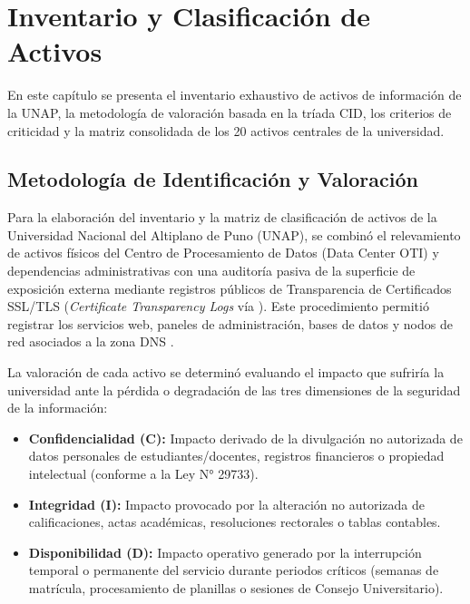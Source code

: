 \chapter{Inventario y Clasificación de Activos}
\label{ch:inventario_activos}

En este capítulo se presenta el inventario exhaustivo de activos de información de la UNAP, la metodología de valoración basada en la tríada CID, los criterios de criticidad y la matriz consolidada de los 20 activos centrales de la universidad.

\section{Metodología de Identificación y Valoración}

Para la elaboración del inventario y la matriz de clasificación de activos de la Universidad Nacional del Altiplano de Puno (UNAP), se combinó el relevamiento de activos físicos del Centro de Procesamiento de Datos (Data Center OTI) y dependencias administrativas con una auditoría pasiva de la superficie de exposición externa mediante registros públicos de Transparencia de Certificados SSL/TLS (\textit{Certificate Transparency Logs} vía ). Este procedimiento permitió registrar los servicios web, paneles de administración, bases de datos y nodos de red asociados a la zona DNS .

La valoración de cada activo se determinó evaluando el impacto que sufriría la universidad ante la pérdida o degradación de las tres dimensiones de la seguridad de la información:

\begin{itemize}[itemsep=2.5pt,topsep=1.5pt,parsep=0pt]
    \item \textbf{Confidencialidad (C):} Impacto derivado de la divulgación no autorizada de datos personales de estudiantes/docentes, registros financieros o propiedad intelectual (conforme a la Ley N° 29733).
    \item \textbf{Integridad (I):} Impacto provocado por la alteración no autorizada de calificaciones, actas académicas, resoluciones rectorales o tablas contables.
    \item \textbf{Disponibilidad (D):} Impacto operativo generado por la interrupción temporal o permanente del servicio durante periodos críticos (semanas de matrícula, procesamiento de planillas o sesiones de Consejo Universitario).
\end{itemize}

